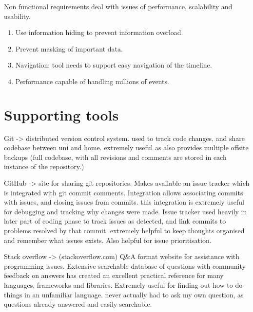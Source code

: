 Non functional requirements deal with issues of performance, scalability and usability.
\begin{enumerate}
\item{Use information hiding to prevent information overload.}
\item{Prevent masking of important data.}
\item{Navigation: tool needs to support easy navigation of the timeline.}
\item{Performance capable of handling millions of events.}
\end{enumerate}

\section{Supporting tools}
Git -> distributed version control system. used to track code changes, and share codebase between uni and home. extremely useful as also provides multiple offsite backups (full codebase, with all revisions and comments are stored in each instance of the repository.)

GitHub -> site for sharing git repositories. Makes available an issue tracker which is integrated with git commit comments. Integration allows associating commits with issues, and closing issues from commits. this integration is extremely useful for debugging and tracking why changes were made. Issue tracker used heavily in later part of coding phase to track issues as detected, and link commits to problems resolved by that commit.
extremely helpful to keep thoughts organised and remember what issues exists. Also helpful for issue prioritisation.

Stack overflow -> (stackoverflow.com) Q\&A format website for assistance with programming issues. Extensive searchable database of questions with community feedback on answers has created an excellent practical reference for many languages, frameworks and libraries.  Extremely useful for finding out how to do things in an unfamiliar language. never actually had to ask my own question, as questions already answered and easily searchable.